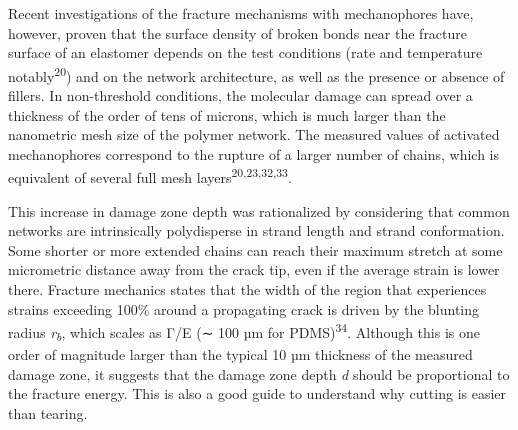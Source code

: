 \documentclass{article}
\begin{document}
Recent investigations of the fracture mechanisms with mechanophores have, however, proven that the surface density of broken bonds near the fracture surface of an elastomer depends on the test conditions (rate and temperature notably\textsuperscript{20}) and on the network architecture, as well as the presence or absence of fillers. In non-threshold conditions, the molecular damage can spread over a thickness of the order of tens of microns, which is much larger than the nanometric mesh size of the polymer network. The measured values of activated mechanophores correspond to the rupture of a larger number of chains, which is equivalent of several full mesh layers\textsuperscript{20,23,32,33}.

This increase in damage zone depth was rationalized by considering that common networks are intrinsically polydisperse in strand length and strand conformation. Some shorter or more extended chains can reach their maximum stretch at some micrometric distance away from the crack tip, even if the average strain is lower there. Fracture mechanics states that the width of the region that experiences strains exceeding 100\% around a propagating crack is driven by the blunting radius \emph{r}\textsubscript{\emph{b}}, which scales as Γ/E (∼ 100 µm for PDMS)\textsuperscript{34}. Although this is one order of magnitude larger than the typical 10 µm thickness of the measured damage zone, it suggests that the damage zone depth \emph{d} should be proportional to the fracture energy. This is also a good guide to understand why cutting is easier than tearing.
\end{document}
